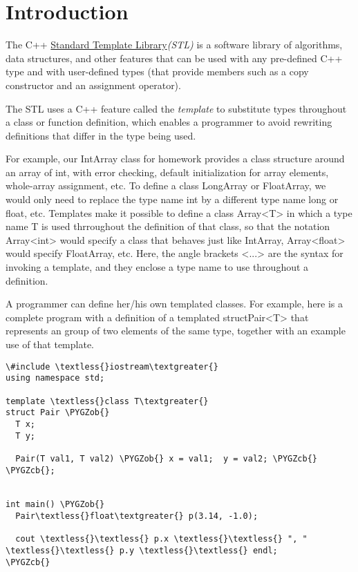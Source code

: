 \documentclass[letterpaper,10pt,openany,oneside]{sphinxmanual}
\def\PYGZob{\char`\{}
\def\PYGZcb{\char`\}}
\begin{document}
\section{Introduction}
\label{IntroSTLContainers/introduction_stl_containers:introduction}
The C++
\href{http://www.cplusplus.com/reference/stl/}{Standard Template Library}\emph{(STL)}
is a software library of algorithms, data structures, and other features
that can be used with any pre-defined C++ type and with user-defined
types (that provide members such as a copy constructor and an assignment
operator).

The STL uses a C++ feature called the \emph{template} to substitute
types throughout a class or function definition, which enables a
programmer to avoid rewriting definitions that differ in the type being
used.

For example, our IntArray class for homework provides a class
structure around an array of int, with error checking, default
initialization for array elements, whole-array assignment, etc. To
define a class LongArray or FloatArray, we would only need to replace
the type name int by a different type name long or float, etc. Templates
make it possible to define a class Array\textless{}T\textgreater{} in which a type name T is
used thrroughout the definition of that class, so that the notation
Array\textless{}int\textgreater{} would specify a class that behaves just like IntArray,
Array\textless{}float\textgreater{} would specify FloatArray, etc. Here, the angle brackets
\textless{}...\textgreater{} are the syntax for invoking a template, and they enclose a type
name to use throughout a definition.

A programmer can define her/his own templated classes. For
example, here is a complete program with a definition of a templated
structPair\textless{}T\textgreater{} that represents an group of two elements of the same type,
together with an example use of that template.

\begin{Verbatim}[commandchars=\\\{\}]
   \#include \textless{}iostream\textgreater{}
using namespace std;

template \textless{}class T\textgreater{}
struct Pair \PYGZob{}
  T x;
  T y;

  Pair(T val1, T val2) \PYGZob{} x = val1;  y = val2; \PYGZcb{}
\PYGZcb{};


int main() \PYGZob{}
  Pair\textless{}float\textgreater{} p(3.14, -1.0);

  cout \textless{}\textless{} p.x \textless{}\textless{} ", " \textless{}\textless{} p.y \textless{}\textless{} endl;
\PYGZcb{}
\end{Verbatim}
\end{document}
